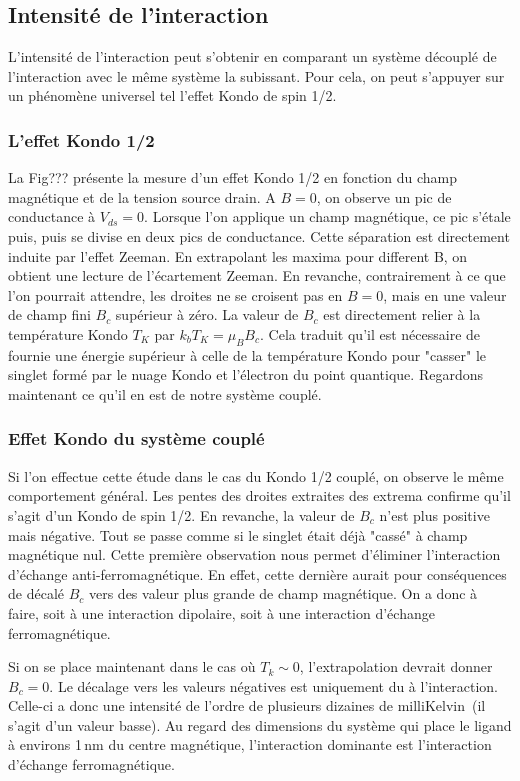\subsection{Intensité de l'interaction}
L'intensité de l'interaction peut s'obtenir en comparant un système découplé de l'interaction avec le même système la subissant. Pour cela, on peut s'appuyer sur un phénomène universel tel l'effet Kondo de spin 1/2.

\subsubsection{L'effet Kondo 1/2}
La Fig??? présente la mesure d'un effet Kondo 1/2 en fonction du champ magnétique et de la tension source drain. A $B=0$, on observe un pic de conductance à $V_{ds}=0$. Lorsque l'on applique un champ magnétique, ce pic s'étale puis, puis se divise en deux pics de conductance. Cette séparation est directement induite par l'effet Zeeman. En extrapolant les maxima pour different B, on obtient une lecture de l'écartement Zeeman. En revanche, contrairement à ce que l'on pourrait attendre, les droites ne se croisent pas en $B=0$, mais en une valeur de champ fini $B_c$ supérieur à zéro. La valeur de $B_c$ est directement relier à la température Kondo $T_K$ par $k_bT_K = \mu_B B_c$. Cela traduit qu'il est nécessaire de fournie une énergie supérieur à celle de la température Kondo pour "casser" le singlet formé par le nuage Kondo et l'électron du point quantique. Regardons maintenant ce qu'il en est de notre système couplé.

\subsubsection{Effet Kondo du système couplé}
Si l'on effectue cette étude dans le cas du Kondo 1/2 couplé, on observe le même comportement général. Les pentes des droites extraites des extrema confirme qu'il s'agit d'un Kondo de spin 1/2. En revanche, la valeur de $B_c$ n'est plus positive mais négative. Tout se passe comme si le singlet était déjà "cassé" à champ magnétique nul. Cette première observation nous permet d'éliminer l'interaction d'échange anti-ferromagnétique. En effet, cette dernière aurait pour conséquences de décalé $B_c$ vers des valeur plus grande de champ magnétique. On a donc à faire, soit à une interaction dipolaire, soit à une interaction d'échange ferromagnétique.

Si on se place maintenant dans le cas où $T_k \sim 0$, l'extrapolation devrait donner $B_c=0$. Le décalage vers les valeurs négatives est uniquement du à l'interaction. Celle-ci a donc une intensité de l'ordre de plusieurs dizaines de milliKelvin~(il s'agit d'un valeur basse). Au regard des dimensions du système qui place le ligand à environs 1\,nm du centre magnétique, l'interaction dominante est l'interaction d'échange ferromagnétique.